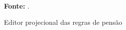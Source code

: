 \begin{figure}[ht!]
\centering

\caption{\textmd{Editor projecional das regras de pensão}}
\label{fig:dslcapgeminitables}

\par\medskip\textbf{Fonte:} \cite{kolkhenk2008}. \par\medskip

\end{figure}

